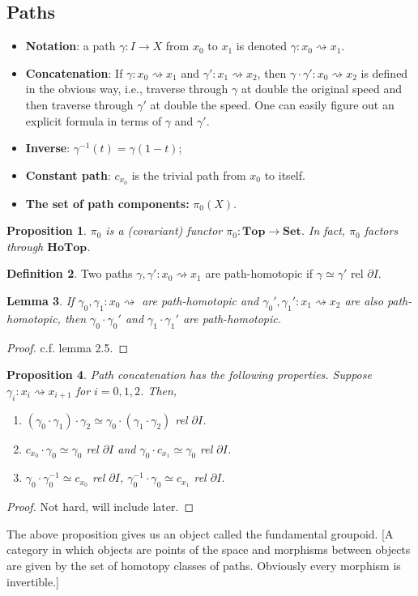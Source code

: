 \documentclass{article}
\theoremstyle{definition}
\newtheorem{defn}{Definition}[section]
\theoremstyle{remark}
\theoremstyle{plain}
\newtheorem{lem}[defn]{Lemma}
\newtheorem{prop}[defn]{Proposition}
\begin{document}
\subsection{Paths}
\begin{itemize}
    \item \textbf{Notation}: a path $\gamma:I\to X$ from $x_0$ to $x_1$ is denoted $\gamma:x_0\rightsquigarrow x_1$.
    \item \textbf{Concatenation}: If $\gamma:x_0\rightsquigarrow x_1$ and $\gamma':x_1\rightsquigarrow x_2$, then $\gamma\cdot\gamma':x_0\rightsquigarrow x_2$ is defined in the obvious way, i.e., traverse through $\gamma$ at double the original speed and then traverse through $\gamma'$ at double the speed. One can easily figure out an explicit formula in terms of $\gamma$ and $\gamma'$.
    \item \textbf{Inverse}: $\gamma^{-1}(t)=\gamma(1-t)$;
    \item \textbf{Constant path}: $c_{x_0}$ is the trivial path from $x_0$ to itself.
    \item \textbf{The set of path components:} $\pi_0(X)$.
\end{itemize}
\begin{prop}
    $\pi_0$ is a (covariant) functor $\pi_0:\mathbf{Top}\to \mathbf{Set}$. In fact, $\pi_0$ factors through $\mathbf{HoTop}$.
\end{prop}
\begin{defn}
    Two paths $\gamma,\gamma':x_0\rightsquigarrow x_1$ are path-homotopic if $\gamma\simeq\gamma'$ rel $\partial I$.
\end{defn}
\begin{lem}
    If $\gamma_0,\gamma_1:x_0\rightsquigarrow$ are path-homotopic and $\gamma_0',\gamma_1':x_1\rightsquigarrow x_2$ are also path-homotopic, then $\gamma_0\cdot\gamma_0'$ and $\gamma_1\cdot\gamma_1'$ are path-homotopic.
\end{lem}
\begin{proof}
    c.f. lemma 2.5.
\end{proof}
\begin{prop}
    Path concatenation has the following properties.  Suppose $\gamma_i:x_i\rightsquigarrow x_{i+1}$ for $i=0,1,2$. Then,
    \begin{enumerate}
        \item $(\gamma_0\cdot\gamma_1)\cdot\gamma_2\simeq\gamma_0\cdot(\gamma_1\cdot\gamma_2)$ rel $\partial I$.
        \item $c_{x_0}\cdot\gamma_0\simeq \gamma_0$ rel $\partial I$ and $\gamma_0\cdot c_{x_1}\simeq \gamma_0$ rel $\partial I$.
        \item $\gamma_0\cdot\gamma_0^{-1}\simeq c_{x_0}$ rel $\partial I$, $\gamma_0^{-1}\cdot\gamma_0\simeq c_{x_1}$ rel $\partial I$.
    \end{enumerate}
\end{prop}
\begin{proof}
    Not hard, will include later.
\end{proof}
The above proposition gives us an object called the fundamental groupoid. [A category in which objects are points of the space and morphisms between objects are given by the set of homotopy classes of paths. Obviously every morphism is invertible.]
\end{document}
